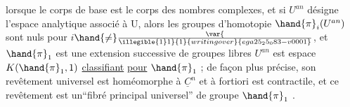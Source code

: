 
lorsque le corps de base est le corps des nombres complexes, et si $U^{an}$
désigne l'espace analytique associé à U, alors les groupes  d'homotopie
$\hand{\pi}_i(U^{an})$  sont nuls pour $i\hand{\neq}\var{\over{\illegible{1}}{1}}{1}{writing over}{ega25_25_083-v0001}$, et  $\hand{\pi}_1$  est une extension successive
de groupes libres   $U^{an}$  est
 espace $K(\hand{\pi}_1 ,1)$\hand{,} \uline{classifiant}  \uline{pour} $\hand{\pi}_1$ ;  de façon plus
précise, son revêtement universel  est  homéomorphe à $\underline{C}^n$  et à fortiori
est contractile, et ce revêtement est un``fibré principal universel'' de
groupe $\hand{\pi}_1$ .

